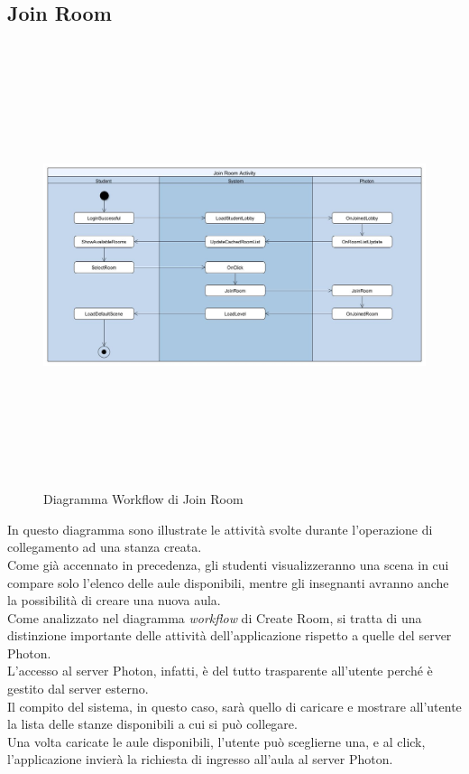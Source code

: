 \subsection{Join Room}
\begin{figure}[H]
    \centering
    \includegraphics[width = 17cm, height = 13cm]{Immagini/JoinRoomActivityDiagram.jpg}
    \caption{Diagramma Workflow di Join Room}
    \label{fig:my_label}
\end{figure}
In questo diagramma sono illustrate le attività svolte durante l'operazione di collegamento ad una stanza creata. 
\\Come già accennato in precedenza, gli studenti visualizzeranno una scena in cui compare solo l'elenco delle aule disponibili, mentre gli insegnanti avranno anche la possibilità di creare una nuova aula. 
\\Come analizzato nel diagramma \textit{workflow} di Create Room, si tratta di una distinzione importante delle attività dell'applicazione rispetto a quelle del server Photon. 
\\L'accesso al server Photon, infatti, è del tutto trasparente all'utente perché è gestito dal server esterno.
\\Il compito del sistema, in questo caso, sarà quello di caricare e mostrare all'utente la lista delle stanze disponibili a cui si può collegare.
\\Una volta caricate le aule disponibili, l'utente può sceglierne una, e al click, l'applicazione invierà la richiesta di ingresso all'aula al server Photon. 
